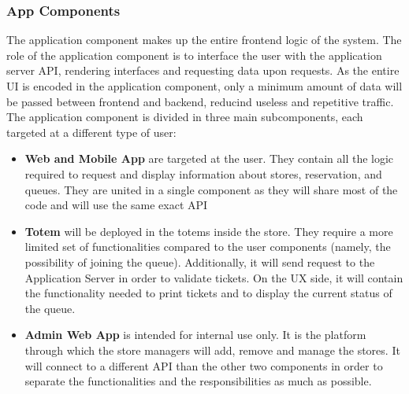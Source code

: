 \subsubsection{App Components}
The application component makes up the entire frontend logic of the system.
The role of the application component is to interface the user with the application server API, rendering interfaces and requesting data upon requests. As the entire UI is encoded in the application component, only a minimum amount of data will be passed between frontend and backend, reducind useless and repetitive traffic.
The application component is divided in three main subcomponents, each targeted at a different type of user:
\begin{itemize}
    \item \textbf{Web and Mobile App} are targeted at the user. They contain all the logic required to request and display information about stores, reservation, and queues. They are united in a single component as they will share most of the code and will use the same exact API
    \item \textbf{Totem} will be deployed in the totems inside the store. They require a more limited set of functionalities compared to the user components (namely, the possibility of joining the queue). Additionally, it will send request to the Application Server in order to validate tickets. On the UX side, it will contain the functionality needed to print tickets and to display the current status of the queue.
    \item \textbf{Admin Web App} is intended for internal use only. It is the platform through which the store managers will add, remove and manage the stores. It will connect to a different API than the other two components in order to separate the functionalities and the responsibilities as much as possible.
\end{itemize}


